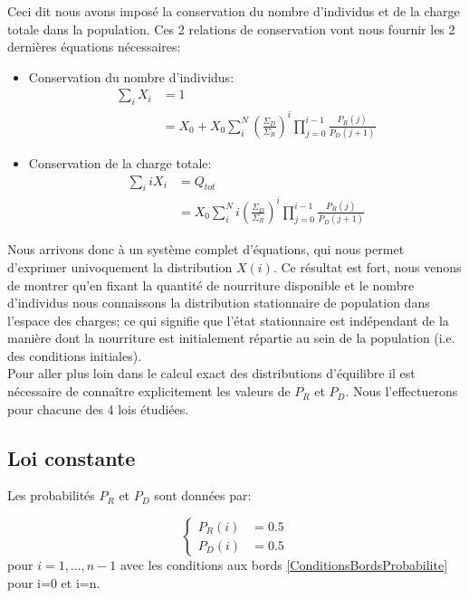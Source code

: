 Ceci dit nous avons imposé la conservation du nombre d'individus et de la charge totale dans la population. Ces 2 relations de conservation vont nous fournir les 2 dernières équations nécessaires:
\begin{itemize}
	\item Conservation du nombre d'individus:
		\begin{equation}
		\begin{aligned}
		\sum_i X_i 	&= 1\\
					&= X_0+X_0 \sum_i^{N} (\frac{\Sigma_D}{\Sigma_R})^i \prod_{j=0}^{i-1}\frac{P_R(j)}{P_D(j+1)}
		\end{aligned}
		\end{equation}
		
	\item Conservation de la charge totale:
		\begin{equation}
		\begin{aligned}
		\sum_i i X_i 	&= Q_{tot}\\
					&= X_0 \sum_i^{N} i (\frac{\Sigma_D}{\Sigma_R})^i \prod_{j=0}^{i-1}\frac{P_R(j)}{P_D(j+1)}
		\end{aligned}
		\end{equation}
\end{itemize}

Nous arrivons donc à un système complet d'équations, qui nous permet d'exprimer univoquement la distribution $X(i)$. Ce résultat est fort, nous venons de montrer qu'en fixant la quantité de nourriture disponible et le nombre d'individus nous connaissons la distribution stationnaire de population dans l'espace des charges; ce qui signifie que l'état stationnaire est indépendant de la manière dont la nourriture est initialement répartie au sein de la population (i.e. des conditions initiales).\\


Pour aller plus loin dans le calcul exact des distributions d'équilibre il est nécessaire de connaître explicitement les valeurs de $P_R$ et $P_D$. Nous l'effectuerons pour chacune des 4 lois étudiées.


\subsection{Loi constante}
Les probabilités $P_R$ et $P_D$ sont données par:

\begin{equation}
\left \{
\begin{aligned}
P_R(i) &= 0.5\\
P_D(i) &= 0.5
\end{aligned}
\right.
\end{equation}
pour $i=1,...,n-1$ avec les conditions aux bords \ref{ConditionsBordsProbabilite} pour i=0 et i=n.\\

